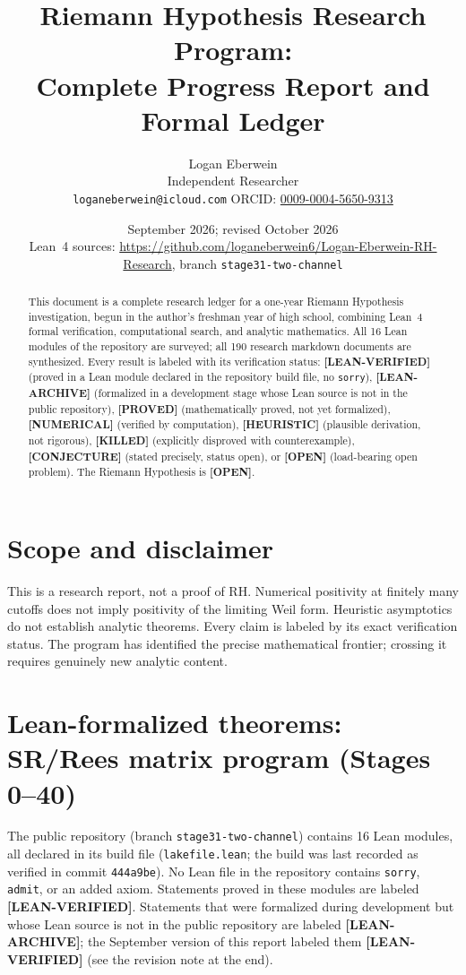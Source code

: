 \documentclass[11pt]{article}
\title{\textbf{Riemann Hypothesis Research Program:\\
Complete Progress Report and Formal Ledger}}
\author{Logan Eberwein\\ \small Independent Researcher \\ \small \texttt{loganeberwein@icloud.com} \quad ORCID: \href{https://orcid.org/0009-0004-5650-9313}{0009-0004-5650-9313}}
\date{September 2026; revised October 2026 \\ \small Lean~4 sources: \url{https://github.com/loganeberwein6/Logan-Eberwein-RH-Research}, branch \texttt{stage31-two-channel}}
\theoremstyle{remark}
\newcommand{\LEANVERIFIED}{\textbf{\color{green!60!black}[LEAN-VERIFIED]}}
\newcommand{\PROVED}{\textbf{\color{blue}[PROVED]}}
\newcommand{\NUMERICAL}{\textbf{\color{orange}[NUMERICAL]}}
\newcommand{\HEURISTIC}{\textbf{\color{orange!80!black}[HEURISTIC]}}
\newcommand{\KILLED}{\textbf{\color{red}[KILLED]}}
\newcommand{\OPEN}{\textbf{\color{purple}[OPEN]}}
\newcommand{\CONJECTURE}{\textbf{\color{violet}[CONJECTURE]}}
\newcommand{\LEANARCHIVE}{\textbf{\color{gray}[LEAN-ARCHIVE]}}
\DeclareRobustCommand{\_}{\ifmmode\text{\textunderscore}\else\textunderscore\allowbreak\fi}
\begin{document}
\maketitle

\begin{abstract}
This document is a complete research ledger for a one-year Riemann Hypothesis investigation, begun in the author's freshman year of high school,
combining Lean~4 formal verification, computational search, and analytic mathematics.
All 16 Lean modules of the repository are surveyed; all 190 research markdown documents are synthesized.
Every result is labeled with its verification status:
\LEANVERIFIED{} (proved in a Lean module declared in the repository build file, no \texttt{sorry}), \LEANARCHIVE{} (formalized in a development stage whose Lean source is not in the public repository),
\PROVED{} (mathematically proved, not yet formalized),
\NUMERICAL{} (verified by computation),
\HEURISTIC{} (plausible derivation, not rigorous),
\KILLED{} (explicitly disproved with counterexample),
\CONJECTURE{} (stated precisely, status open),
or \OPEN{} (load-bearing open problem).
The Riemann Hypothesis is \OPEN{}.
\end{abstract}

\tableofcontents
\newpage

\section{Scope and disclaimer}

This is a research report, not a proof of RH.
Numerical positivity at finitely many cutoffs does not imply positivity of the limiting Weil form.
Heuristic asymptotics do not establish analytic theorems.
Every claim is labeled by its exact verification status.
The program has identified the precise mathematical frontier; crossing it requires genuinely new analytic content.

\section{Lean-formalized theorems: SR/Rees matrix program (Stages 0--40)}

The public repository (branch \texttt{stage31-two-channel}) contains 16 Lean modules, all declared in its build file (\texttt{lakefile.lean}; the build was last recorded as verified in commit \texttt{444a9be}). No Lean file in the repository contains \texttt{sorry}, \texttt{admit}, or an added axiom. Statements proved in these modules are labeled \LEANVERIFIED{}. Statements that were formalized during development but whose Lean source is not in the public repository are labeled \LEANARCHIVE{}; the September version of this report labeled them \LEANVERIFIED{} (see the revision note at the end).
\end{document}
